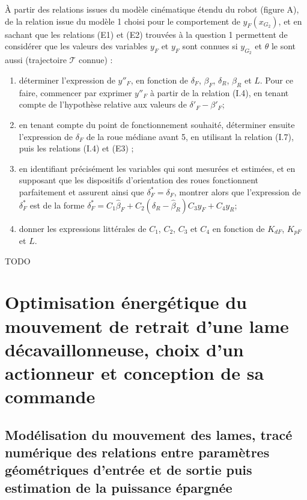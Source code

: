 \documentclass[11pt]{article}
\begin{document}
\UPSTIquestion À partir des relations issues du modèle cinématique étendu du robot (figure A), de la relation issue
du modèle 1 choisi pour le comportement de $y_F\left(x_{G_2}\right)$, et en sachant que les relations (E1) et (E2) trouvées à la question 1 permettent de considérer que les valeurs des variables $y_F$ et $y_F$ sont connues si $y_{G_2}$ et $\theta$ le sont aussi (trajectoire $\mathcal{T}$ connue) :
\begin{enumerate}
\item déterminer l’expression de $y''_F$, en fonction de $\delta_F$, $\beta_F$, $\delta_R$, $\beta_R$ et $L$. Pour ce faire, commencer par exprimer $y''_F$ à partir de la relation (I.4), en tenant compte de l’hypothèse relative aux valeurs de $\delta'_F-\beta'_F$;
\item en tenant compte du point de fonctionnement souhaité, déterminer ensuite l’expression de $\delta_F$ de la roue
médiane avant 5, en utilisant la relation (I.7), puis les relations (I.4) et (E3) ;
\item en identifiant précisément les variables qui sont mesurées et estimées, et en supposant que les dispositifs
d’orientation des roues fonctionnent parfaitement et assurent ainsi que $\delta^*_F = \delta_F$, montrer alors que l’expression de $\delta^*_F$ est de la forme $\delta^*_F =C_1 \hat{\beta}_F +C_2\left(\delta_R - \hat{\beta}_R\right)C_3 y_F + C_4 y_R$;
\item donner les expressions littérales de $C_1$, $C_2$, $C_3$ et $C_4$ en fonction de $K_{dF}$, $K_{pF}$ et $L$.
\end{enumerate}

\begin{UPSTIcorrige}
TODO
\end{UPSTIcorrige}


\section{Optimisation énergétique du mouvement de retrait d’une lame
décavaillonneuse, choix d’un actionneur et conception de sa commande}


\subsection{Modélisation du mouvement des lames, tracé numérique des relations entre paramètres
géométriques d’entrée et de sortie puis estimation de la puissance épargnée}
\end{document}
